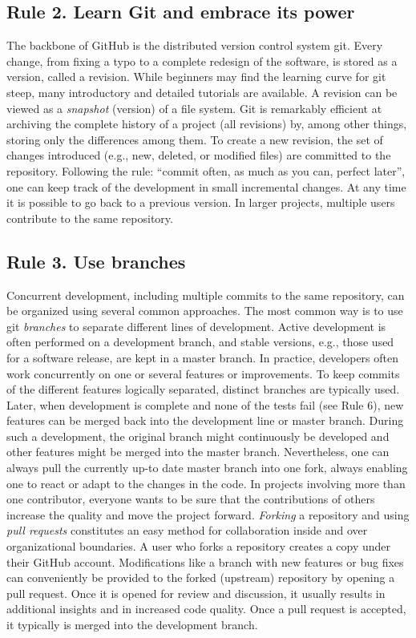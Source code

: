\documentclass[10pt,letterpaper]{article}
\begin{document}
\subsection*{Rule 2. Learn Git and embrace its
power}\label{rule-2.-learn-git-and-embrace-its-power}

The backbone of GitHub is the distributed version control system git.
Every change, from fixing a typo to a complete redesign of the software,
is stored as a version, called a revision. While beginners may
find the learning curve for git steep, many introductory and detailed
tutorials are available. A revision can be viewed as a
\emph{snapshot} (version) of a file system. Git is remarkably efficient
at archiving the complete history of a project (all revisions) by,
among other things, storing only the differences among them. To create
a new revision, the set of changes introduced (e.g., new, deleted, or
modified files) are committed to the repository. Following the rule:
``commit often, as much as you can, perfect later'', one can keep
track of the development in small incremental changes. At any time it is
possible to go back to a previous version. In larger projects, multiple
users contribute to the same repository.

\subsection*{Rule 3. Use branches}\label{rule-3.-use-branches}

Concurrent development, including multiple commits to the same repository, can be
organized using several common approaches. The most common way is to use
git \emph{branches} to separate different lines of development. Active
development is often performed on a development branch, and stable
versions, e.g., those used for a software release, are kept in a master
branch. In practice, developers often work concurrently on one or several features or
improvements. To keep commits of the different features logically
separated, distinct branches are typically used. Later, when development
is complete and none of the tests fail (see Rule 6), new features can be
merged back into the development line or master branch. During such a
development, the original branch might continuously be developed and
other features might be merged into the master branch. Nevertheless, one
can always pull the currently up-to date master branch into one fork,
always enabling one to react or adapt to the changes in the code. In
projects involving more than one contributor, everyone wants to be sure
that the contributions of others increase the quality and move the
project forward. \emph{Forking} a repository and using \emph{pull
requests} constitutes an easy method for collaboration inside and over
organizational boundaries. A user who forks a repository creates a copy
under their GitHub account. Modifications like a branch with new
features or bug fixes can conveniently be provided to the forked
(upstream) repository by opening a pull request. Once it is opened for
review and discussion, it usually results in additional insights and in
increased code quality. Once a pull request is accepted, it typically
is merged into the development branch.
\end{document}

